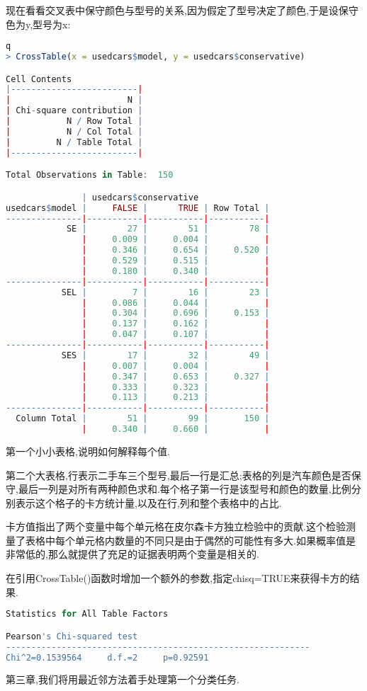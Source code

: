 \documentclass[11pt,a4paper,oneside]{book}
\begin{document}
现在看看交叉表中保守颜色与型号的关系,因为假定了型号决定了颜色,于是设保守色为y,型号为x:
\begin{lstlisting}[language=r]q
> CrossTable(x = usedcars$model, y = usedcars$conservative)

Cell Contents
|-------------------------|
|                       N |
| Chi-square contribution |
|           N / Row Total |
|           N / Col Total |
|         N / Table Total |
|-------------------------|

Total Observations in Table:  150 

               | usedcars$conservative 
usedcars$model |     FALSE |      TRUE | Row Total | 
---------------|-----------|-----------|-----------|
            SE |        27 |        51 |        78 | 
               |     0.009 |     0.004 |           | 
               |     0.346 |     0.654 |     0.520 | 
               |     0.529 |     0.515 |           | 
               |     0.180 |     0.340 |           | 
---------------|-----------|-----------|-----------|
           SEL |         7 |        16 |        23 | 
               |     0.086 |     0.044 |           | 
               |     0.304 |     0.696 |     0.153 | 
               |     0.137 |     0.162 |           | 
               |     0.047 |     0.107 |           | 
---------------|-----------|-----------|-----------|
           SES |        17 |        32 |        49 | 
               |     0.007 |     0.004 |           | 
               |     0.347 |     0.653 |     0.327 | 
               |     0.333 |     0.323 |           | 
               |     0.113 |     0.213 |           | 
---------------|-----------|-----------|-----------|
  Column Total |        51 |        99 |       150 | 
               |     0.340 |     0.660 |           | 
\end{lstlisting}
第一个小小表格,说明如何解释每个值.

第二个大表格,行表示二手车三个型号,最后一行是汇总;表格的列是汽车颜色是否保守,最后一列是对所有两种颜色求和.每个格子第一行是该型号和颜色的数量,比例分别表示这个格子的卡方统计量,以及在行,列和整个表格中的占比.

\begin{tcolorbox}[colback=pink!10!white,colframe=pink!100!black]
卡方值指出了两个变量中每个单元格在皮尔森卡方独立检验中的贡献.这个检验测量了表格中每个单元格内数量的不同只是由于偶然的可能性有多大.如果概率值是非常低的,那么就提供了充足的证据表明两个变量是相关的.
\end{tcolorbox}
在引用CrossTable()函数时增加一个额外的参数,指定chisq=TRUE来获得卡方的结果.
\begin{lstlisting}[language=r]
Statistics for All Table Factors

Pearson's Chi-squared test 
------------------------------------------------------------
Chi^2=0.1539564     d.f.=2     p=0.92591 
\end{lstlisting}
第三章,我们将用最近邻方法着手处理第一个分类任务.
\end{document}
